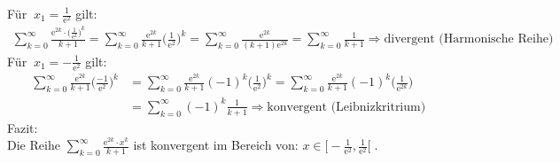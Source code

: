 \textbullet\;\; Für$\;\;x_1=\frac{1}{\mathrm{e}^2} $ gilt:\\
\begin{align*}
	\sum\limits_{k=0}^{\infty}\frac{\mathrm{e}^{2k}\cdot \big(\frac{1}{\mathrm{e}^2}\big)^k}{k+1}=\sum\limits_{k=0}^{\infty}\frac{\mathrm{e}^{2k}}{k+1}\bigg(\frac{1}{\mathrm{e}^2}\bigg)^k=\sum\limits_{k=0}^{\infty}\frac{\mathrm{e}^{2k}}{(k+1)\mathrm{e}^{2k}}=\sum\limits_{k=0}^{\infty}\frac{1}{k+1}\Rightarrow\text{divergent (Harmonische Reihe) }
\end{align*}
\textbullet\;\; Für$\;\;x_1=-\frac{1}{\mathrm{e}^2} $ gilt:\\
\begin{align*}
	\sum\limits_{k=0}^{\infty}\frac{\mathrm{e}^{2k}}{k+1}\bigg(\frac{-1}{\mathrm{e}^2}\bigg)^k&=\sum\limits_{k=0}^{\infty}\frac{\mathrm{e}^{2k}}{k+1}(-1)^k\bigg(\frac{1}{\mathrm{e}^2}\bigg)^k=\sum\limits_{k=0}^{\infty}\frac{\mathrm{e}^{2k}}{k+1}(-1)^k\bigg(\frac{1}{\mathrm{e}^{2k}}\bigg)\\&=\sum\limits_{k=0}^{\infty}(-1)^k\frac{1}{k+1}\Rightarrow\text{konvergent (Leibnizkritrium) }
\end{align*}
Fazit:\\
Die Reihe $ \sum\limits_{k=0}^{\infty}\frac{\mathrm{e}^{2k}\cdot x^k}{k+1} $ ist konvergent im Bereich von: $ x\in\big[-\frac{1}{\mathrm{e}^2},\frac{1}{\mathrm{e}^2}\big[\; $.\\
\newpage
\noindent
